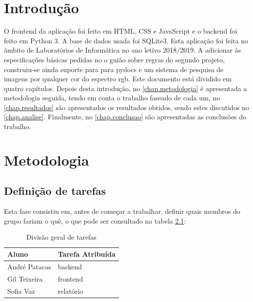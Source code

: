 \documentclass{report}
\begin{document}
\tableofcontents
 \listoftables     %
 \listoffigures    %


\clearpage
{}

\chapter{Introdução}
\label{chap.introducao}

O frontend da aplicação foi feito em \ac{HTML}, \ac{CSS} e JavaScript e o
backend foi feito em Python 3. A base de dados usada foi SQLite3. Esta aplicação 
foi feita no âmbito de Laboratórios de Informática no ano letivo 2018/2019.
A adicionar às especificações básicas pedidas no o guião sobre regras do segundo projeto, 
construiu-se ainda suporte para para pydocs e um sistema de pesquisa de imagens por qualquer 
cor do espectro rgb.
Este documento está dividido em quatro capítulos.
Depois desta introdução,
no \autoref{chap.metodologia} é apresentada a metodologia seguida, tendo em conta o trabalho faseado de cada um, 
no \autoref{chap.resultados} são apresentados os resultados obtidos,
sendo estes discutidos no \autoref{chap.analise}.
Finalmente, no \autoref{chap.conclusao} são apresentadas
as conclusões do trabalho.

\chapter{Metodologia}
\label{chap.metodologia}
\section{Definição de tarefas}
Esta fase consistiu em, antes de começar a trabalhar, definir quais membros do grupo fariam o quê, o que pode ser consultado na tabela \ref{tab:table1}: 
\begin{table}[h!]
\begin{center}
\caption{Divisão geral de tarefas}
\begin{tabular}{l|l}
\hline
\multicolumn{1}{|l|}{Aluno} & \multicolumn{1}{l|}{Tarefa Atribuída} \\ \hline
            André Patacas   & backend                               \\ 
            Gil Teixeira      & frontend                               \\
            Sofia Vaz         & relatório                                
\end{tabular}
\label{tab:table1}
\end{center}
\end{table}
\end{document}
